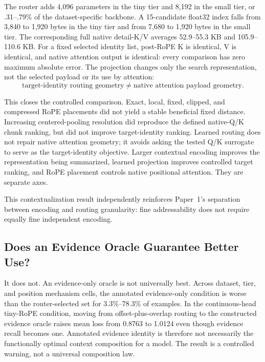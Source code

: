 \documentclass[11pt]{article}
\begin{document}
The router adds 4,096 parameters in the tiny tier and 8,192 in the small tier, or
.31--.79\% of the dataset-specific backbone. A 15-candidate float32 index falls from
3,840 to 1,920 bytes in the tiny tier and from 7,680 to 1,920 bytes in the small tier. The
corresponding full native detail-K/V averages 52.9--55.3 KB and 105.9--110.6 KB. For a fixed
selected identity list, post-RoPE K is identical, V is identical, and native attention output
is identical: every comparison has zero maximum absolute error. The projection changes only
the search representation, not the selected payload or its use by attention:
\begin{equation}
 \boxed{\text{target-identity routing geometry}\ne\text{native attention payload geometry}.}
\end{equation}

This closes the controlled comparison. Exact, local, fixed, clipped, and compressed RoPE
placements did not yield a stable beneficial fixed distance. Increasing centered-pooling
resolution did reproduce the defined native-Q/K chunk ranking, but did not improve
target-identity ranking. Learned routing does not repair native attention geometry; it avoids
asking the tested Q/K surrogate to serve as the target-identity objective. Larger contextual
encoding improves the representation being summarized, learned projection improves controlled
target ranking, and RoPE placement controls native positional attention. They are separate axes.

This contextualization result independently reinforces Paper~1's separation between encoding
and routing granularity: fine addressability does not require equally fine independent encoding.

\subsection{Does an Evidence Oracle Guarantee Better Use?}

It does not. An evidence-only oracle is not universally best. Across dataset, tier, and position
mechanism cells, the annotated evidence-only condition is worse than the router-selected set
for 3.3\%--78.3\% of examples. In the continuous-head tiny-RoPE condition, moving from
offset-plus-overlap routing to the constructed evidence oracle raises mean loss from 0.8763
to 1.0124 even though evidence recall becomes one. Annotated evidence identity is therefore
not necessarily the functionally optimal context composition for a model. The result is a
controlled warning, not a universal composition law.
\end{document}
